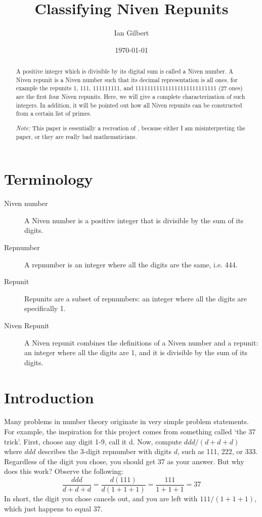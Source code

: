 \documentclass{LaTeX/amsart}
\begin{document}
\title{Classifying Niven Repunits}
\author{Ian Gilbert}
\date{\today}

\begin{abstract}
A positive integer which is divisible by its digital sum is called a Niven number. A Niven repunit is a Niven number such that its decimal representation is all ones, for example the repunits 1, 111, 111111111, and 111111111111111111111111111 (27 ones) are the first four Niven repunits. Here, we will give a complete characterization of such integers. In addition, it will be pointed out how all Niven repunits can be constructed from a certain list of primes.

\textit{Note:} This paper is essentially a recreation of \cite{nivenrepunits}, because either I am misinterpreting the paper, or they are really bad mathematicians.
\end{abstract}

\maketitle

\section*{Terminology}

\begin{description}
\item[Niven number] A Niven number is a positive integer that is divisible by the sum of its digits.
\item[Repnumber] A repnumber is an integer where all the digits are the same, i.e. 444.
\item[Repunit] Repunits are a subset of repnumbers: an integer where all the digits are specifically 1.
\item[Niven Repunit] A Niven repunit combines the definitions of a Niven number and a repunit: an integer where all the digits are 1, and it is divisible by the sum of its digits.
\end{description}

\section{Introduction}

Many problems in number theory originate in very simple problem statements. For example, the inspiration for this project comes from something called `the 37 trick'. First, choose any digit 1-9, call it d. Now, compute $ddd/(d+d+d)$ where $ddd$ describes the 3-digit repnumber with digits $d$, such as 111, 222, or 333. Regardless of the digit you chose, you should get 37 as your answer. But why does this work? Observe the following: \[\frac{ddd}{d+d+d}=\frac{d(111)}{d(1+1+1)}=\frac{111}{1+1+1}=37\] In short, the digit you chose cancels out, and you are left with $111/(1+1+1)$, which just happens to equal 37.
\end{document}
